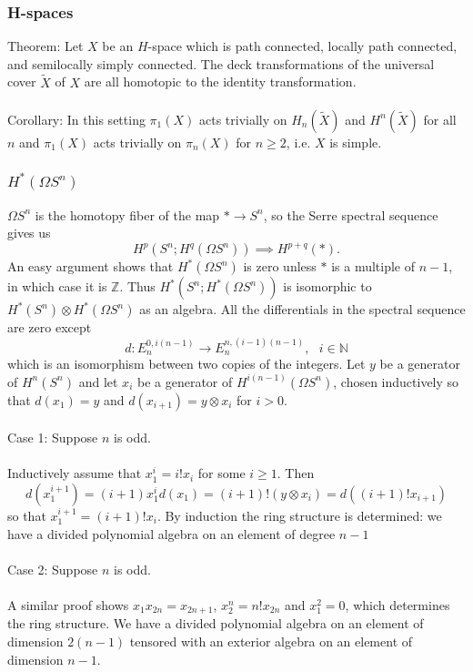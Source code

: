 \documentclass[11pt]{article}
\begin{document}
\begin{Jandr SSS notes}
	\subsubsection{H-spaces}
Theorem: Let $X$ be an $H$-space which is path connected, locally path connected, and semilocally simply connected. The deck transformations of the universal cover $\tilde{X}$ of $X$ are all homotopic to the identity transformation.\\
\\
Corollary: In this setting $\pi_1(X)$ acts trivially on $H_n(\tilde{X})$ and $H^n(\tilde{X})$ for all $n$ and $\pi_1(X)$ acts trivially on $\pi_n(X)$ for $n\geq 2$, i.e. $X$ is simple.


	\subsubsection{$H^*(\Omega S^n)$}
$\Omega S^n$ is the homotopy fiber of the map $*\to S^n$, so the Serre spectral sequence gives us
\[H^p(S^n;H^q(\Omega S^n))\implies H^{p+q}(*).\]
An easy argument shows that
$H^*(\Omega S^n)$ is zero unless $*$ is a multiple of $n-1$, in which case it is $\mathbb{Z}$. Thus $H^*(S^n;H^*(\Omega S^n))$ is isomorphic to  $H^*(S^n)\otimes H^*(\Omega S^n)$ as an algebra. All the differentials in the spectral sequence are zero except
\[d:E_n^{0,i(n-1)}\to E_n^{n,(i-1)(n-1)}, \hspace{8pt} i\in\mathbb{N}\]
which is an isomorphism between two copies of the integers. Let $y$ be a generator of $H^n(S^n)$ and let $x_i$ be a generator of $H^{i(n-1)}(\Omega S^n)$, chosen inductively so that $d(x_1)=y$ and $d(x_{i+1})=y\otimes x_i$ for $i>0$.\\
\\
Case 1: Suppose $n$ is odd.\\
\\
Inductively assume that $x_1^i=i!x_i$ for some $i\geq 1$. Then
\[d(x_1^{i+1})=(i+1)x_1^i d(x_1)=(i+1)!(y\otimes x_i)=d((i+1)!x_{i+1})\]
so that $x_1^{i+1}=(i+1)!x_i$. By induction the ring structure is determined: we have a divided polynomial algebra on an element of degree $n-1$\\
\\
Case 2: Suppose $n$ is odd.\\
\\
A similar proof shows $x_1 x_{2n}=x_{2n+1}$, $x_2^n=n!x_{2n}$ and $x_1^2=0$, which determines the ring structure. We have a divided polynomial algebra on an element of dimension $2(n-1)$ tensored with an exterior algebra on an element of dimension $n-1$.



\end{Jandr SSS notes}
\end{document}
